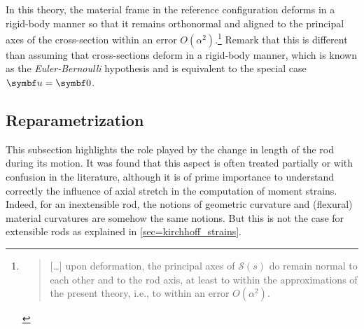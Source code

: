 In this theory, the material frame in the reference configuration deforms in a rigid-body manner so that it remains orthonormal and aligned to the principal axes of the cross-section within an error $O(\alpha^2)$.\footnote{\blockcquote[p.~344]{Coleman1993}{[\dots] upon deformation, the principal axes of $\mathcal{S}(s)$ do remain normal to each other and to the rod axis, at least to within the approximations of the present theory, i.e., to within an error $O(\alpha^2).$}.} Remark that this is different than assuming that cross-sections deform in a rigid-body manner, which is known as the \emph{Euler-Bernoulli} hypothesis and is equivalent to the special case $\vect{u} = \vect{0}$.

\subsection{Reparametrization}
This subsection highlights the role played by the change in length of the rod during its motion. It was found that this aspect is often treated partially or with confusion in the literature, although it is of prime importance to understand correctly the influence of axial stretch in the computation of moment strains. Indeed, for an inextensible rod, the notions of geometric curvature and (flexural) material curvatures are somehow the same notions. But this is not the case for extensible rods as explained in \cref{sec=kirchhoff_strains}.



